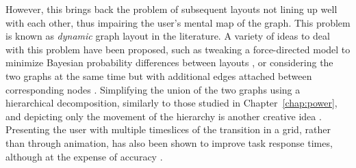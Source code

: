 However, this brings back the problem of subsequent layouts not lining up well with each other, thus impairing the user's mental map \citep{Eades1991, Diehl2001} of the graph. This problem is known as \emph{dynamic} graph layout in the literature.
A variety of ideas to deal with this problem have been proposed, such as tweaking a force-directed model to minimize Bayesian probability differences between layouts \citep{Brandes1997}, or considering the two graphs at the same time but with additional edges attached between corresponding nodes \citep{Erten2003}. Simplifying the union of the two graphs using a hierarchical decomposition, similarly to those studied in Chapter~\ref{chap:power}, and depicting only the movement of the hierarchy is another creative idea \citep{Archambault2009}. Presenting the user with multiple timeslices of the transition in a grid, rather than through animation, has also been shown to improve task response times, although at the expense of accuracy \citep{Archambault2011}.

